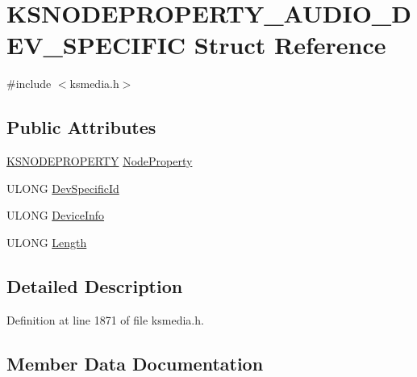 \hypertarget{struct_k_s_n_o_d_e_p_r_o_p_e_r_t_y___a_u_d_i_o___d_e_v___s_p_e_c_i_f_i_c}{}\section{K\+S\+N\+O\+D\+E\+P\+R\+O\+P\+E\+R\+T\+Y\+\_\+\+A\+U\+D\+I\+O\+\_\+\+D\+E\+V\+\_\+\+S\+P\+E\+C\+I\+F\+IC Struct Reference}
\label{struct_k_s_n_o_d_e_p_r_o_p_e_r_t_y___a_u_d_i_o___d_e_v___s_p_e_c_i_f_i_c}


{\ttfamily \#include $<$ksmedia.\+h$>$}

\subsection*{Public Attributes}
\begin{DoxyCompactItemize}
\item 
\hyperlink{struct_k_s_n_o_d_e_p_r_o_p_e_r_t_y}{K\+S\+N\+O\+D\+E\+P\+R\+O\+P\+E\+R\+TY} \hyperlink{struct_k_s_n_o_d_e_p_r_o_p_e_r_t_y___a_u_d_i_o___d_e_v___s_p_e_c_i_f_i_c_adf2e6d75bdd1185c667072f6afe915bb}{Node\+Property}
\item 
U\+L\+O\+NG \hyperlink{struct_k_s_n_o_d_e_p_r_o_p_e_r_t_y___a_u_d_i_o___d_e_v___s_p_e_c_i_f_i_c_a5967ede4c617e275fb3e9fec3fee606a}{Dev\+Specific\+Id}
\item 
U\+L\+O\+NG \hyperlink{struct_k_s_n_o_d_e_p_r_o_p_e_r_t_y___a_u_d_i_o___d_e_v___s_p_e_c_i_f_i_c_a4687686d920983740540635a0845eeb4}{Device\+Info}
\item 
U\+L\+O\+NG \hyperlink{struct_k_s_n_o_d_e_p_r_o_p_e_r_t_y___a_u_d_i_o___d_e_v___s_p_e_c_i_f_i_c_af963eb8fa4d87bb1454df95f7cdf3619}{Length}
\end{DoxyCompactItemize}


\subsection{Detailed Description}


Definition at line 1871 of file ksmedia.\+h.



\subsection{Member Data Documentation}
